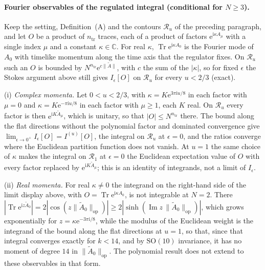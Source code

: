 \paragraph{Fourier observables of the regulated integral (conditional for \(N\ge3\)).}
Keep the setting, Definition~(A) and the contours \(\mathcal R_u\) of the preceding paragraph, and let \(O\) be a product of \(n_{\mathrm{tr}}\) traces, each of a product of factors \(\mathrm e^{\mathrm i\kappa A_\mu}\) with a single index \(\mu\) and a constant \(\kappa\in\mathbb C\). For real \(\kappa\), \(\operatorname{Tr}\mathrm e^{\mathrm i\kappa A_0}\) is the Fourier mode of \(A_0\) with timelike momentum along the time axis that the regulator fixes. On \(\mathcal R_u\) such an \(O\) is bounded by \(N^{n_{\mathrm{tr}}}\mathrm e^{c\|\tilde A\|}\), with \(c\) the sum of the \(|\kappa|\), so for fixed \(\epsilon\) the Stokes argument above still gives \(I_\epsilon[O]\) on \(\mathcal R_u\) for every \(u<2/3\) (exact).

(i) \emph{Complex momenta.} Let \(0<u<2/3\), with \(\kappa=K\mathrm e^{3\pi\mathrm iu/8}\) in each factor with \(\mu=0\) and \(\kappa=K\mathrm e^{-\pi\mathrm iu/8}\) in each factor with \(\mu\ge1\), each \(K\) real. On \(\mathcal R_u\) every factor is then \(\mathrm e^{\mathrm iK\tilde A_\mu}\), which is unitary, so that \(|O|\le N^{n_{\mathrm{tr}}}\) there. The bound along the flat directions without the polynomial factor and dominated convergence give \(\lim_{\epsilon\to0^+}I_\epsilon[O]=I^{(u)}[O]\), the integral on \(\mathcal R_u\) at \(\epsilon=0\), and the ratios converge where the Euclidean partition function does not vanish. At \(u=1\) the same choice of \(\kappa\) makes the integral on \(\mathcal R_1\) at \(\epsilon=0\) the Euclidean expectation value of \(O\) with every factor replaced by \(\mathrm e^{\mathrm iK\tilde A_\mu}\); this is an identity of integrands, not a limit of \(I_\epsilon\).

(ii) \emph{Real momenta.} For real \(\kappa\neq0\) the integrand on the right-hand side of the limit display above, with \(O=\operatorname{Tr}\mathrm e^{\mathrm i\kappa A_0}\), is not integrable at \(N=2\). There \(|\operatorname{Tr}\mathrm e^{\mathrm iz\tilde A_0}|=2|\cos(z\|\tilde A_0\|_{\mathrm{op}})|\ge2|\sinh(\operatorname{Im}z\,\|\tilde A_0\|_{\mathrm{op}})|\), which grows exponentially for \(z=\kappa\mathrm e^{-3\pi\mathrm i/8}\), while the modulus of the Euclidean weight is the integrand of the bound along the flat directions at \(u=1\), so that, since that integral converges exactly for \(k<14\), and by \(\mathrm{SO}(10)\) invariance, it has no moment of degree \(14\) in \(\|\tilde A_0\|_{\mathrm{op}}\). The polynomial result does not extend to these observables in that form.

